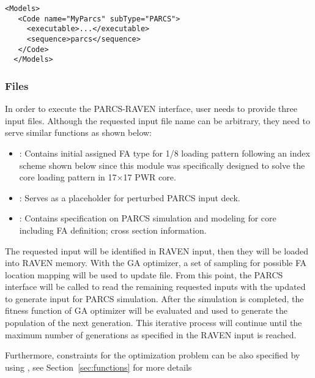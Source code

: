 \begin{lstlisting}[style=XML]
  <Models>
   <Code name="MyParcs" subType="PARCS">
     <executable>...</executable>
     <sequence>parcs</sequence>
   </Code>
  </Models>
  \end{lstlisting}

\subsubsection{Files}
In order to execute the PARCS-RAVEN interface, user needs to provide three input files.
Although the requested input file name can be arbitrary, they need to serve similar functions as shown below:
\begin{itemize}
	\item {}: Contains initial assigned FA type for 1/8 loading pattern following an index scheme shown below since this module was specifically designed to solve the core loading pattern in 17$\times$17 PWR core.
	\item {}: Serves as a placeholder for perturbed PARCS input deck.
	\item {}: Contains specification on PARCS simulation and modeling for core including FA definition; cross section information.
\end{itemize}
The requested input will be identified in RAVEN input, then they will be loaded into RAVEN memory.
With the GA optimizer, a set of sampling for possible FA location mapping
will be used to update  file. From this point, the PARCS interface will be called to
read the remaining requested inputs with the updated  to generate input
for PARCS simulation. After the simulation is completed, the fitness function of GA
optimizer will be evaluated and used to generate the population of the next generation.
This iterative process will continue until the maximum number of generations as specified
in the RAVEN input is reached.

Furthermore, constraints for the optimization problem can be also specified by using 
, see Section~\ref{sec:functions} for more details

